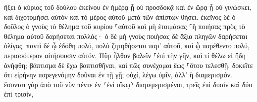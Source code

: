 \documentclass{openreader}
\begin{document}
ἥξει ὁ κύριος τοῦ δούλου ἐκείνου ἐν ἡμέρᾳ ᾗ οὐ προσδοκᾷ καὶ ἐν ὥρᾳ ᾗ οὐ γινώσκει, καὶ διχοτομήσει αὐτὸν καὶ τὸ μέρος αὐτοῦ μετὰ τῶν ἀπίστων θήσει. 
ἐκεῖνος δὲ ὁ δοῦλος ὁ γνοὺς τὸ θέλημα τοῦ κυρίου ⸀αὐτοῦ καὶ μὴ ἑτοιμάσας ⸀ἢ ποιήσας πρὸς τὸ θέλημα αὐτοῦ δαρήσεται πολλάς· 
ὁ δὲ μὴ γνοὺς ποιήσας δὲ ἄξια πληγῶν δαρήσεται ὀλίγας. παντὶ δὲ ᾧ ἐδόθη πολύ, πολὺ ζητηθήσεται παρ’ αὐτοῦ, καὶ ᾧ παρέθεντο πολύ, περισσότερον αἰτήσουσιν αὐτόν. 
Πῦρ ἦλθον βαλεῖν ⸀ἐπὶ τὴν γῆν, καὶ τί θέλω εἰ ἤδη ἀνήφθη; 
βάπτισμα δὲ ἔχω βαπτισθῆναι, καὶ πῶς συνέχομαι ἕως ⸀ὅτου τελεσθῇ. 
δοκεῖτε ὅτι εἰρήνην παρεγενόμην δοῦναι ἐν τῇ γῇ; οὐχί, λέγω ὑμῖν, ἀλλ’ ἢ διαμερισμόν. 
ἔσονται γὰρ ἀπὸ τοῦ νῦν πέντε ἐν ⸂ἑνὶ οἴκῳ⸃ διαμεμερισμένοι, τρεῖς ἐπὶ δυσὶν καὶ δύο ἐπὶ τρισίν, 
\end{document}
